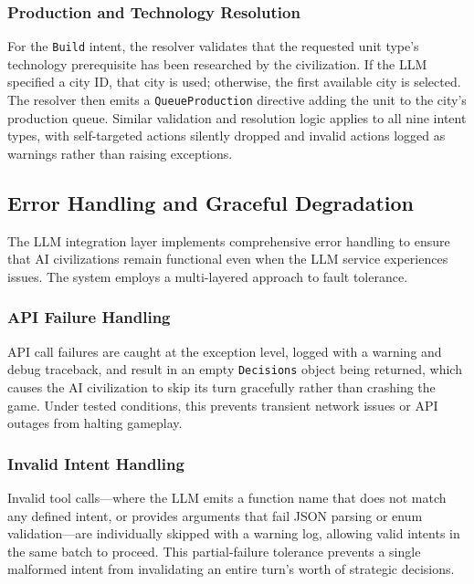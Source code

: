 \documentclass[conference]{IEEEtran}
\begin{document}
\subsubsection{Production and Technology Resolution}

For the \texttt{Build} intent, the resolver validates that the requested unit type's technology prerequisite has been researched by the civilization. If the LLM specified a city ID, that city is used; otherwise, the first available city is selected. The resolver then emits a \texttt{QueueProduction} directive adding the unit to the city's production queue. Similar validation and resolution logic applies to all nine intent types, with self-targeted actions silently dropped and invalid actions logged as warnings rather than raising exceptions.

\subsection{Error Handling and Graceful Degradation}

The LLM integration layer implements comprehensive error handling to ensure that AI civilizations remain functional even when the LLM service experiences issues. The system employs a multi-layered approach to fault tolerance.

\subsubsection{API Failure Handling}

API call failures are caught at the exception level, logged with a warning and debug traceback, and result in an empty \texttt{Decisions} object being returned, which causes the AI civilization to skip its turn gracefully rather than crashing the game. Under tested conditions, this prevents transient network issues or API outages from halting gameplay.

\subsubsection{Invalid Intent Handling}

Invalid tool calls---where the LLM emits a function name that does not match any defined intent, or provides arguments that fail JSON parsing or enum validation---are individually skipped with a warning log, allowing valid intents in the same batch to proceed. This partial-failure tolerance prevents a single malformed intent from invalidating an entire turn's worth of strategic decisions.
\end{document}
